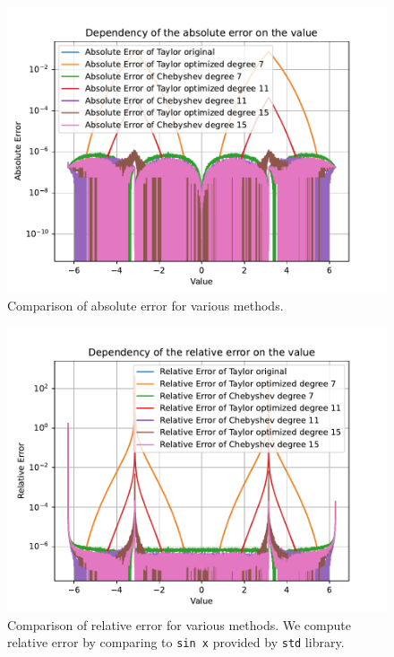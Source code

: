 \documentclass[12pt]{article}
\begin{document}
\begin{figure}[h]
    \centering
    \includegraphics[width=\textwidth]{plots/accuracy/num_abs_two_pi_001.pdf}
    \caption{Comparison of absolute error for various methods.}
    \label{fig:abs_error_two_pi}
  \end{figure}

  \begin{figure}[h]
    \centering
    \includegraphics[width=\textwidth]{plots/accuracy/num_rel_two_pi_001.pdf}
    \caption{Comparison of relative error for various methods. We compute relative error by comparing to \texttt{sin x} provided by \texttt{std} library.}
    \label{fig:rel_error_two_pi}
  \end{figure}
\end{document}
